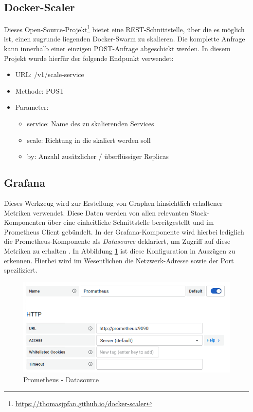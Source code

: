 \subsection{Docker-Scaler}
Dieses Open-Source-Projekt\footnote{\url{https://thomasjpfan.github.io/docker-scaler}} bietet eine REST-Schnittstelle, über die es möglich ist, einen zugrunde liegenden Docker-Swarm zu skalieren. Die komplette Anfrage kann innerhalb einer einzigen POST-Anfrage abgeschickt werden. In diesem Projekt wurde hierfür der folgende Endpunkt verwendet:

\begin{itemize}
  \item URL: /v1/scale-service
  \item Methode: POST
  \item Parameter:
  \begin{itemize}
    \item service: Name des zu skalierenden Services
    \item scale: Richtung in die skaliert werden soll 
    \item by: Anzahl zusätzlicher / überflüssiger Replicas
  \end{itemize}
\end{itemize}

\subsection{Grafana}

Dieses Werkzeug wird zur Erstellung von Graphen hinsichtlich erhaltener Metriken verwendet. Diese Daten werden von allen relevanten Stack-Komponenten über eine einheitliche Schnittstelle bereitgestellt und im Prometheus Client gebündelt. In der Grafana-Komponente wird hierbei lediglich die Prometheus-Komponente als \emph{Datasource} deklariert, um Zugriff auf diese Metriken zu erhalten \cite[Seite~99 ff.]{oreillyPrometheus}. In Abbildung \ref{fig:prometheusDatasource}  ist diese Konfiguration in Auszügen zu erkennen. Hierbei wird im Wesentlichen die Netzwerk-Adresse sowie der Port spezifiziert. 

\begin{figure}[ht!]
	\centering
	\includegraphics[width=.9\linewidth]{kapitel/problemloesung/implementierung/_img/prometheus-datasource}
	\caption[Prometheus - Datasource]{Prometheus - Datasource}
	\label{fig:prometheusDatasource}
\end{figure}

